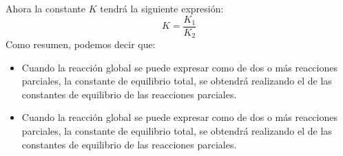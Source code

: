     Ahora la constante \(K\) tendrá la siguiente expresión:
    \begin{equation*}
        K = \dfrac{K_1}{K_2}
    \end{equation*}
    Como resumen, podemos decir que:
    \begin{itemize}
        \item Cuando la reacción global se puede expresar como  de dos o más reacciones parciales, la constante de equilibrio total, se obtendrá realizando el  de las constantes de equilibrio de las reacciones parciales.
        \item Cuando la reacción global se puede expresar como  de dos o más reacciones parciales, la constante de equilibrio total, se obtendrá realizando el  de las constantes de equilibrio de las reacciones parciales.
    \end{itemize}
